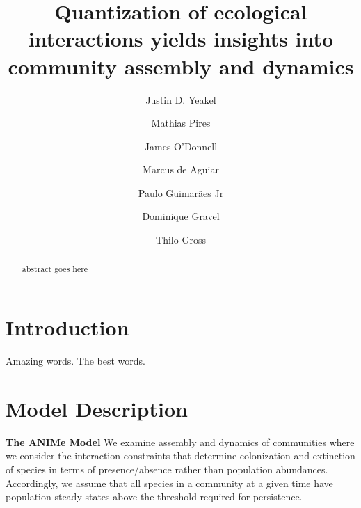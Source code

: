 \documentclass[twocolumn,preprintnumbers,amsmath,amssymb,superscriptaddress]{revtex4}
\begin{document}
\author{Justin D. Yeakel} 

\author{Mathias Pires} \affiliation{}

\author{James O'Donnell} \affiliation{}

\author{Marcus de Aguiar} \affiliation{}

\author{Paulo Guimar\~aes Jr} \affiliation{}

\author{Dominique Gravel} \affiliation{}

\author{Thilo Gross} \affiliation{}

\title{Quantization of ecological interactions yields insights into community assembly and dynamics}


\begin{abstract}
abstract goes here
\end{abstract}

\maketitle

\section*{Introduction}

Amazing words. The best words.



\section*{Model Description}

{\bf The ANIMe Model} 
We examine assembly and dynamics of communities where we consider the interaction constraints that determine colonization and extinction of species in terms of presence/absence rather than population abundances.
Accordingly, we assume that all species in a community at a given time have population steady states above the threshold required for persistence.
\end{document}
